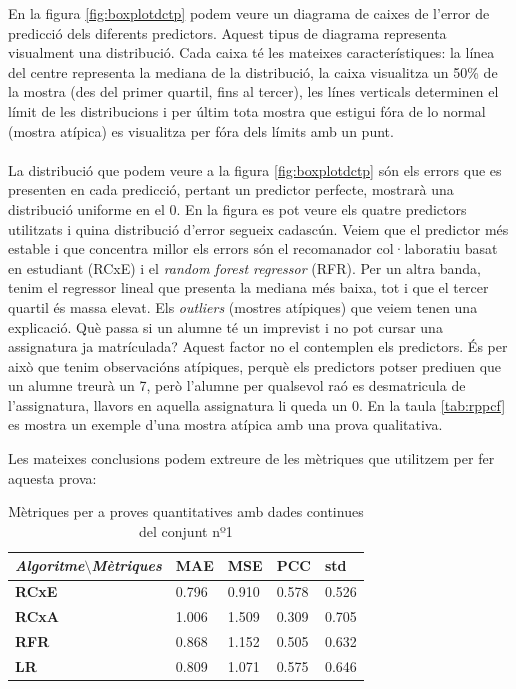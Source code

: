\documentclass[12pt,a4paper,catalan]{article}
\begin{document}
En la figura \ref{fig:boxplotdctp} podem veure un diagrama de caixes de l'error de predicció dels diferents predictors. Aquest tipus de diagrama representa visualment una distribució. Cada caixa té les mateixes característiques: la línea del centre representa la mediana de la distribució, la caixa visualitza un 50\% de la mostra (des del primer quartil, fins al tercer), les línes verticals determinen el límit de les distribucions i per últim tota mostra que estigui fóra de lo normal (mostra atípica) es visualitza per fóra dels límits amb un punt.
\\
\\
La distribució que podem veure a la figura \ref{fig:boxplotdctp} són els errors que es presenten en cada predicció, pertant un predictor perfecte, mostrarà una distribució uniforme en el 0. En la figura es pot veure els quatre predictors utilitzats i quina distribució d'error segueix cadascún. Veiem que el predictor més estable i que concentra millor els errors són el recomanador col·laboratiu basat en estudiant (RCxE) i el \textit{random forest regressor} (RFR). Per un altra banda, tenim el regressor lineal que presenta la mediana més baixa, tot i que el tercer quartil és massa elevat. Els \textit{outliers} (mostres atípiques) que veiem tenen una explicació. Què passa si un alumne té un imprevist i no pot cursar una assignatura ja matrículada? Aquest factor no el contemplen els predictors. És per això que tenim observacións atípiques, perquè els predictors potser prediuen que un alumne treurà un 7, però l'alumne per qualsevol raó es desmatricula de l'assignatura, llavors en aquella assignatura li queda un 0. En la taula \ref{tab:rppcf} es mostra un exemple d'una mostra atípica amb una prova qualitativa.

Les mateixes conclusions podem extreure de les mètriques que utilitzem per fer aquesta prova:

\begin{table}[h]
\centering
\begin{tabular}{lllll}
\hline
\textit{\textbf{Algoritme$\setminus$Mètriques}} & \textbf{MAE} & \textbf{MSE} & \textbf{PCC} & \textbf{std} \\ \hline
\textbf{RCxE}          & 0.796          & 0.910          & 0.578          & 0.526          \\
\textbf{RCxA}          & 1.006          & 1.509          & 0.309          & 0.705          \\
\textbf{RFR}           & 0.868          & 1.152          & 0.505          & 0.632          \\
\textbf{LR}            & 0.809          & 1.071          & 0.575          & 0.646          \\ \hline
\end{tabular}
\caption{Mètriques per a proves quantitatives amb dades continues del conjunt nº1}
\label{tab:mpqdctp}
\end{table}
\end{document}
